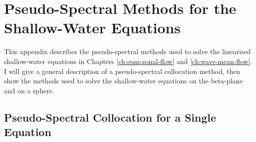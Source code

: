 %
%
%
%
%
%
%

%
%




\chapter{Pseudo-Spectral Methods for the Shallow-Water Equations}\label{ap:ps-methods}

This appendix describes the pseudo-spectral methods used to solve the linearised shallow-water equations in Chapters \ref{ch:eqm-zonal-flow} and \ref{ch:wave-mean-flow}. I will give a general description of a pseudo-spectral collocation method, then show the methods used to solve the shallow-water equations on the beta-plane and on a sphere.

\section{Pseudo-Spectral Collocation for a Single Equation}

